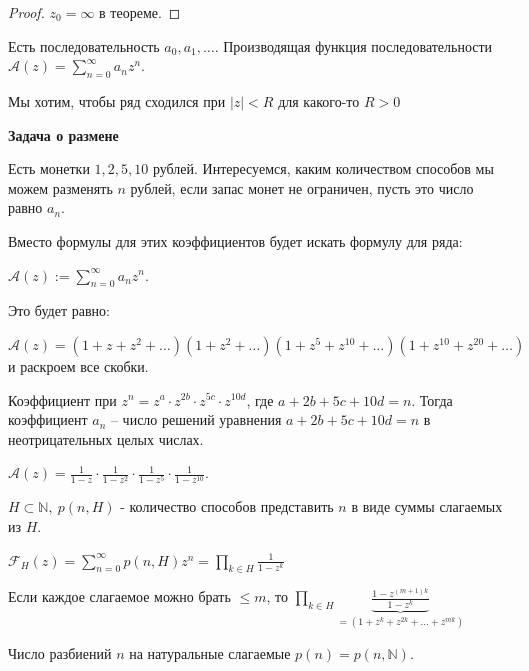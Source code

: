 \begin{proof}
    $z_0 = \infty$ в теореме.
\end{proof}


\begin{definition}
    Есть последовательность $a_0, a_1, \ldots$. Производящая функция последовательности
    $\mathcal{A}(z) = \sum_{n = 0}^{\infty} a_nz^n$.

    Мы хотим, чтобы ряд сходился при $|z| < R$ для какого-то $R > 0$
\end{definition}

\begin{example}
    \textbf{Задача о размене}

    Есть монетки $1, 2, 5, 10$ рублей. Интересуемся, каким количеством способов мы можем разменять $n$ рублей, если запас монет не ограничен, пусть это число равно $a_n$.

    Вместо формулы для этих коэффициентов будет искать формулу для ряда:

    $\mathcal{A}(z) := \sum_{n=0}^{\infty} a_n z^n$.

    Это будет равно:

    $\mathcal{A}(z) = (1 + z + z^2 + \ldots)(1 + z^2 + \ldots)(1 + z^5 + z^{10} + \ldots)(1 + z^{10} + z^{20} + \ldots)$ и
    раскроем все скобки.

    Коэффициент при $z^n = z^a \cdot z^{2b} \cdot z^{5c} \cdot z^{10d}$, где $a + 2b + 5c + 10d = n$.
    Тогда коэффициент $a_n$ -- число решений уравнения $a + 2b + 5c + 10d = n$ в неотрицательных целых числах.

    $\mathcal{A}(z) = \frac{1}{1 - z} \cdot \frac{1}{1 - z^2} \cdot \frac{1}{1 - z^5} \cdot \frac{1}{1 - z^{10}}$.
\end{example}

\begin{definition}
    $H \subset \mathbb{N}, \ p(n, H)$ - количество способов представить $n$ в виде суммы слагаемых из $H$.

    $\mathcal{F}_{H}(z) = \sum_{n=0}^{\infty} p(n, H) z^n = \prod_{k \in H} \frac{1}{1 - z^k}$

    Если каждое слагаемое можно брать $\leqslant m$, то $\prod_{k \in H} \underbrace{\frac{1 - z^{(m+1)k}}{1 - z^k}}_{=(1 + z^k + z^{2k} + \dots + z^{mk})}$
\end{definition}

\begin{definition}
    Число разбиений $n$ на натуральные слагаемые $p(n) = p(n, \mathbb{N})$.
\end{definition}

